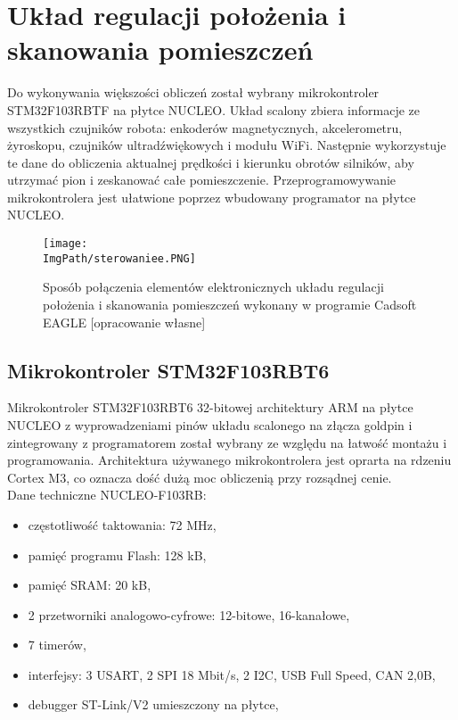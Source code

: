 \documentclass[a4paper,12pt,twoside,openany]{report}
\newcommand{\ImgPath}{.}
\begin{document}
\newpage

\section{Układ regulacji położenia i skanowania pomieszczeń}

Do wykonywania większości obliczeń został wybrany mikrokontroler STM32F103RBTF na płytce NUCLEO. Układ scalony zbiera informacje ze wszystkich czujników robota: enkoderów magnetycznych, akcelerometru, żyroskopu, czujników ultradźwiękowych i modułu WiFi. Następnie wykorzystuje te dane do obliczenia aktualnej prędkości i kierunku obrotów silników, aby utrzymać pion i zeskanować całe pomieszczenie.
Przeprogramowywanie mikrokontrolera jest ułatwione poprzez wbudowany programator na płytce NUCLEO.

\begin{figure}[!htbp]
	\begin{center}
\centering
\texttt{[image: \\ImgPath/sterowaniee.PNG]}
\end{center}
	\caption{Sposób połączenia elementów elektronicznych układu regulacji położenia i skanowania pomieszczeń wykonany w programie Cadsoft EAGLE [opracowanie własne]}
	\label{schematKomunikacji}
\end{figure}

\newpage

\newpage

\subsection{Mikrokontroler STM32F103RBT6}

Mikrokontroler STM32F103RBT6 32-bitowej architektury ARM na płytce NUCLEO z wyprowadzeniami pinów układu scalonego na złącza goldpin i zintegrowany z programatorem został wybrany ze względu na łatwość montażu i programowania. Architektura używanego mikrokontrolera jest oprarta na rdzeniu Cortex M3, co oznacza dość dużą moc obliczenią przy rozsądnej cenie.\\
Dane techniczne NUCLEO-F103RB:
\begin{itemize}
\item częstotliwość taktowania: 72 MHz,
\item pamięć programu Flash: 128 kB,
\item pamięć SRAM: 20 kB,
\item 2 przetworniki analogowo-cyfrowe: 12-bitowe, 16-kanałowe,
\item 7 timerów,
\item interfejsy: 3 USART, 2 SPI 18 Mbit/s, 2 I2C, USB Full Speed, CAN 2,0B,
\item debugger ST-Link/V2 umieszczony na płytce,
\end{itemize}
\end{document}
